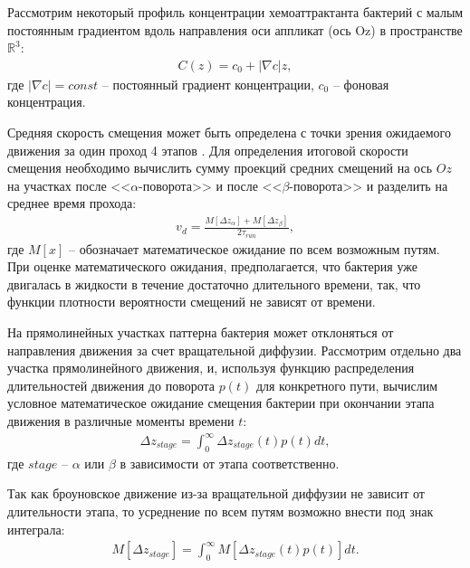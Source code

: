 Рассмотрим некоторый профиль концентрации хемоаттрактанта бактерий с малым постоянным градиентом вдоль направления оси аппликат (ось Oz) в пространстве $\mathbb{R}^3$:
\begin{equation}
    \begin{aligned}
        C(z) = c_0 + |\nabla c| z,
    \label{eq:linear-concentration}
    \end{aligned}
\end{equation}
где $|\nabla c|=const$ -- постоянный градиент концентрации, $c_0$ -- фоновая концентрация.

Средняя скорость смещения может быть определена с точки зрения ожидаемого движения за один проход 4 этапов \cite{locsei_persistence_2007}. Для определения итоговой скорости смещения необходимо вычислить сумму проекций средних смещений на ось $Oz$ на участках после <<$\alpha$-поворота>> и после <<$\beta$-поворота>> и разделить на среднее время прохода:
\begin{equation}
    \begin{aligned}
        v_d=\frac{M[\Delta z_{\alpha}] + M[\Delta z_{\beta}]}{{2\tau_{run}}},
    \label{eq:drift-speed-alpha-beta}
    \end{aligned}
\end{equation}
где $M[x]$ -- обозначает математическое ожидание по всем возможным путям. При оценке математического ожидания, предполагается, что бактерия уже двигалась в жидкости в течение достаточно длительного времени, так, что функции плотности вероятности смещений не зависят от времени. 

На прямолинейных участках паттерна бактерия может отклоняться от направления движения за счет вращательной диффузии. Рассмотрим отдельно два участка прямолинейного движения, и, используя функцию распределения длительностей движения до поворота $p(t)$ для конкретного пути, вычислим условное математическое ожидание смещения бактерии при окончании этапа движения в различные моменты времени $t$:
\begin{equation}
    \begin{aligned}
        \Delta z_{stage}=\int_0^{\infty} \Delta z_{stage}(t)p(t)dt,
    \label{eq:displacement-integral-time}
    \end{aligned}
\end{equation}
где $stage$ -- $\alpha$ или $\beta$ в зависимости от этапа соответственно.

Так как броуновское движение из-за вращательной диффузии не зависит от длительности этапа, то усреднение по всем путям возможно внести под знак интеграла:
\begin{equation}
    \begin{aligned}
        M[\Delta z_{stage}]=\int_0^{\infty} M[\Delta z_{stage}(t)p(t)]dt.
    \label{eq:mean-displacement-integral-time}
    \end{aligned}
\end{equation}

